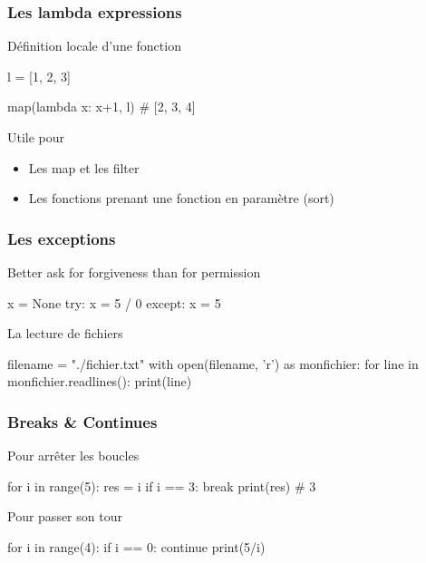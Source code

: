 \documentclass{beamer}
\begin{document}
\begin{frame}[fragile]
  \frametitle{Les lambda expressions}
  \begin{block}{Définition locale d'une fonction}
    \begin{python}
l = [1, 2, 3]

map(lambda x: x+1, l) # [2, 3, 4]
    \end{python}
  \end{block}

  \pause

  \begin{block}{Utile pour}
    \begin{itemize}
    \item Les map et les filter
    \item Les fonctions prenant une fonction en paramètre (sort)
    \end{itemize}
  \end{block}

\end{frame}

\begin{frame}[fragile]
  \frametitle{Les exceptions}

  \begin{block}{Better ask for forgiveness than for permission}
    \begin{python}
x = None
try:
  x = 5 / 0
except:
  x = 5
    \end{python}
  \end{block}

  \pause

  \begin{block}{La lecture de fichiers}
    \begin{python}
filename = "./fichier.txt"
with open(filename, 'r') as monfichier:
  for line in monfichier.readlines():
    print(line)
    \end{python}
  \end{block}

\end{frame}

\begin{frame}[fragile]
  \frametitle{Breaks \& Continues}

  \begin{block}{Pour arrêter les boucles}
    \begin{python}
for i in range(5):
  res = i
  if i == 3:
    break
print(res) # 3
    \end{python}
  \end{block}

  \pause

  \begin{block}{Pour passer son tour}
    \begin{python}
for i in range(4):
  if i == 0:
    continue
  print(5/i)
    \end{python}
  \end{block}

\end{frame}
\end{document}
